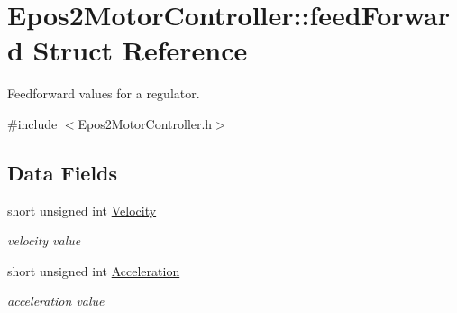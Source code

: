 \hypertarget{structEpos2MotorController_1_1feedForward}{\section{Epos2\-Motor\-Controller\-:\-:feed\-Forward Struct Reference}
\label{structEpos2MotorController_1_1feedForward}
}


Feedforward values for a regulator.  




{\ttfamily \#include $<$Epos2\-Motor\-Controller.\-h$>$}

\subsection*{Data Fields}
\begin{DoxyCompactItemize}
\item 
\hypertarget{structEpos2MotorController_1_1feedForward_af233a49c7dba92b20f086d64f1bf76cf}{short unsigned int \hyperlink{structEpos2MotorController_1_1feedForward_af233a49c7dba92b20f086d64f1bf76cf}{Velocity}}\label{structEpos2MotorController_1_1feedForward_af233a49c7dba92b20f086d64f1bf76cf}

\begin{DoxyCompactList}\small\item\em velocity value \end{DoxyCompactList}\item 
\hypertarget{structEpos2MotorController_1_1feedForward_ad1933dbf01444a9f5256abf61cc42306}{short unsigned int \hyperlink{structEpos2MotorController_1_1feedForward_ad1933dbf01444a9f5256abf61cc42306}{Acceleration}}\label{structEpos2MotorController_1_1feedForward_ad1933dbf01444a9f5256abf61cc42306}

\begin{DoxyCompactList}\small\item\em acceleration value \end{DoxyCompactList}\end{DoxyCompactItemize}
